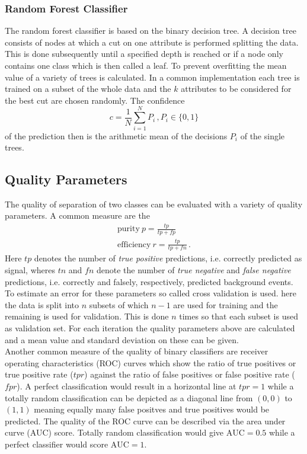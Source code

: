 \subsubsection*{Random Forest Classifier}
The random forest classifier is based on the binary decision tree.
A decision tree consists of nodes at which a cut on one attribute is performed splitting the data. This is done subsequently until a specified depth is reached or if a node only contains one class which is then called a leaf. To prevent overfitting the mean value of a variety of trees is calculated. In a common implementation each tree is trained on a subset of the whole data and the $k$ attributes to be considered for the best cut are chosen randomly. The confidence
\begin{equation*}
  c  = \frac{1}{N} \sum\limits_{i=1}^{N} P_i \, , P_i \in \{0,1\}
\end{equation*}
of the prediction then is the arithmetic mean of the decisions $P_i$ of the single trees.

\subsection{Quality Parameters}
The quality of separation of two classes can be evaluated with a variety of quality parameters. A common measure are the
\begin{align*}
  \mathrm{purity}\ p = \frac{tp}{tp + fp} \\
  \mathrm{efficiency} \ r = \frac{tp}{tp + fn}\, .
\end{align*}
Here $tp$ denotes the number of \textit{true positive} predictions, i.e. correctly predicted as signal, wheres $tn$ and $fn$ denote the number of  \textit{true negative} and \textit{false negative} predictions, i.e. correctly and falsely, respectively, predicted background events.\\

To estimate an error for these parameters so called cross validation is used. here the data is split into $n$ subsets of which $n - 1$ are used for training and the remaining is used for validation. This is done $n$ times so that each subset is used as validation set. For each iteration the quality parameters above are calculated and a mean value and standard deviation on these can be given.\\

Another common measure of the quality of binary classifiers are receiver operating characteristics (ROC) curves which show the ratio of true positives or true positive rate ($tpr$) against the ratio of false positives or false positive rate ($fpr$).
A perfect classification would result in a horizontal line at $tpr = 1$ while a totally random classification can be depicted as a diagonal line from $(0,0)$ to $(1,1)$ meaning equally many false positves and true positives would be predicted. The quality of the ROC curve can be described via the area under curve (AUC) score.
Totally random classification would give $\mathrm{AUC} = 0.5$ while a perfect classifier would score $\mathrm{AUC} = 1$.
